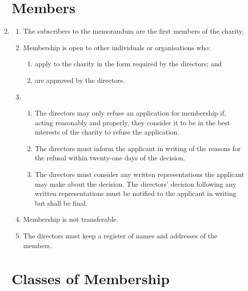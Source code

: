 \begin{enumerate}
\section{Members}

\item
  \label{cls:subscribers}
  \begin{enumerate}
  \item
    The subscribers to the memorandum are the first members of the
    charity.
  \item
    Membership is open to other individuals or organisations who:
    \begin{enumerate}
    \item
      apply to the charity in the form required by the directors; and
    \item
      are approved by the directors.
    \end{enumerate}
  \item
    

    \begin{enumerate}
    \item
      The directors may only refuse an application for membership if,
      acting reasonably and properly, they consider it to be in the best
      interests of the charity to refuse the application.
    \item
      The directors must inform the applicant in writing of the reasons
      for the refusal within twenty-one days of the decision.
    \item
      The directors must consider any written representations the
      applicant may make about the decision. The directors' decision
      following any written representations must be notified to the
      applicant in writing but shall be final.
    \end{enumerate}
  \item
    Membership is not transferable.
  \item
    The directors must keep a register of names and addresses of the
    members.
  \end{enumerate}

\section{Classes of Membership}


\end{enumerate}
